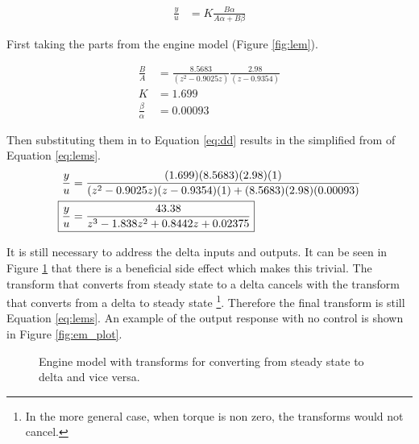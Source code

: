 \documentclass{article}
\begin{document}
\begin{align}
\frac{y}{u} &= K \frac{B \alpha}{A \alpha + B \beta} \label{eq:dd}
\end{align}

First taking the parts from the engine model (Figure \ref{fig:lem}).

\begin{align*}
	\frac{B}{A} &= \frac{8.5683}{(z^2 - 0.9025z)} \frac{2.98}{(z - 0.9354)} \\
	K &= 1.699 \\
	\frac{\beta}{\alpha} &= 0.00093 
\end{align*}

\begin{samepage}
Then substituting them in to Equation \ref{eq:dd} results in
the simplified from of Equation \ref{eq:lems}.
\begin{align}
	\frac{y}{u} &= \frac{(1.699) (8.5683) (2.98) (1)}
		{(z^2 - 0.9025z)(z - 0.9354)(1) + (8.5683)(2.98)(0.00093)} \notag \\
	\Aboxed{ \frac{y}{u} &= \frac{43.38}{z^3 - 1.838 z^2 + 0.8442 z + 0.02375}}
		\label{eq:lems}
\end{align}
\end{samepage}

\begin{samepage}
It is still necessary to address the delta inputs and outputs.
It can be seen in Figure \ref{fig:nodelta} that there is a beneficial
side effect which makes this trivial.
The transform that converts from steady state to a delta cancels
with the transform that converts from a delta to steady state
\footnote{In the more general case, when torque is non zero,
the transforms would not cancel.}.
Therefore the final transform is still Equation \ref{eq:lems}.
An example of the output response with no control is shown in
Figure \ref{fig:em_plot}.
\end{samepage}

\begin{figure}[!htbp]

\begin{center}
\end{center}

\caption{Engine model with transforms for converting from steady state
to delta and vice versa.}
\label{fig:nodelta}

\end{figure}
\end{document}
